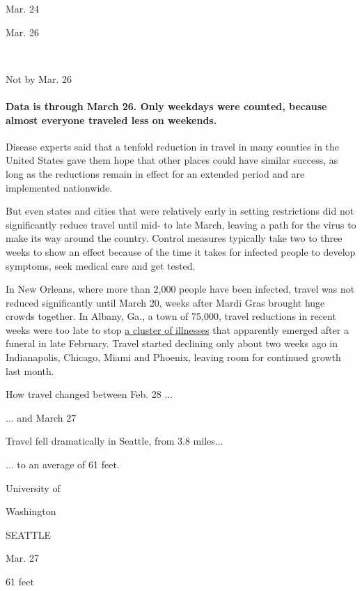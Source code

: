 Mar. 24

Mar. 26

~

Not by Mar. 26

\hypertarget{data-is-through-march-26-only-weekdays-were-counted-because-almost-everyone-traveled-less-on-weekends}{%
\paragraph{Data is through March 26. Only weekdays were counted, because
almost everyone traveled less on
weekends.}\label{data-is-through-march-26-only-weekdays-were-counted-because-almost-everyone-traveled-less-on-weekends}}

Disease experts said that a tenfold reduction in travel in many counties
in the United States gave them hope that other places could have similar
success, as long as the reductions remain in effect for an extended
period and are implemented nationwide.

But even states and cities that were relatively early in setting
restrictions did not significantly reduce travel until mid- to late
March, leaving a path for the virus to make its way around the country.
Control measures typically take two to three weeks to show an effect
because of the time it takes for infected people to develop symptoms,
seek medical care and get tested.

In New Orleans, where more than 2,000 people have been infected, travel
was not reduced significantly until March 20, weeks after Mardi Gras
brought huge crowds together. In Albany, Ga., a town of 75,000, travel
reductions in recent weeks were too late to stop
\href{https://www.nytimes.com/2020/03/30/us/coronavirus-funeral-albany-georgia.html}{a
cluster of illnesses} that apparently emerged after a funeral in late
February. Travel started declining only about two weeks ago in
Indianapolis, Chicago, Miami and Phoenix, leaving room for continued
growth last month.

How travel changed between Feb. 28 ...

... and March 27

Travel fell dramatically in Seattle, from 3.8 miles...

... to an average of 61 feet.

University of

Washington

SEATTLE

Mar. 27

61 feet

